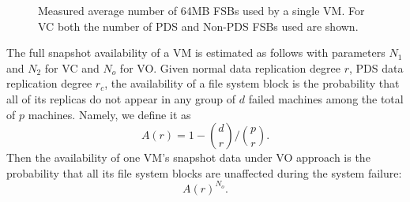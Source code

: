 \begin{figure}[htbp]
  \centering
  \caption{Measured average number of 64MB FSBs used by a single VM. For VC both the number of PDS and Non-PDS FSBs used are shown.}
  \label{fig:vm-links}
\end{figure}

The full snapshot availability of a VM is estimated as follows with parameters $N_1$ and
 $N_2$ for VC and $N_o$ for VO.
Given normal data replication degree $r$, PDS data replication degree $r_c$, 
the availability of a file system block is the probability that  
all of its replicas do not appear in any group of $d$ failed machines among the total of $p$ machines. 
Namely, we define it as
\[
A(r) = 1-\binom{d}{r}/ \binom{p}{r}. 
\]
Then the availability of one VM's snapshot data under VO approach is the probability that
 all its file system blocks are unaffected during the system failure:
\begin{equation}
\label{eq:VO}
A(r)^{N_o}. 
\end{equation}

